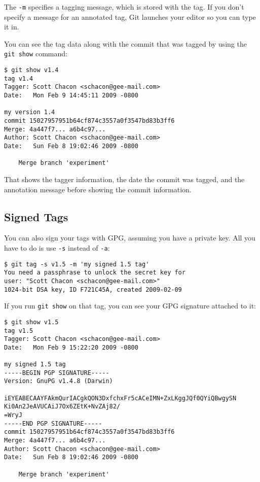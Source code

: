 \documentclass[a4paper]{book}
\begin{document}
The \texttt{-m} specifies a tagging message, which is stored with the tag. If you don't specify a message for an annotated tag, Git launches your editor so you can type it in.

You can see the tag data along with the commit that was tagged by using the \texttt{git show} command:

\begin{shaded}\begin{verbatim}
$ git show v1.4
tag v1.4
Tagger: Scott Chacon <schacon@gee-mail.com>
Date:   Mon Feb 9 14:45:11 2009 -0800

my version 1.4
commit 15027957951b64cf874c3557a0f3547bd83b3ff6
Merge: 4a447f7... a6b4c97...
Author: Scott Chacon <schacon@gee-mail.com>
Date:   Sun Feb 8 19:02:46 2009 -0800

    Merge branch 'experiment'
\end{verbatim}\end{shaded}

That shows the tagger information, the date the commit was tagged, and the annotation message before showing the commit information.

\subsection{Signed Tags}

You can also sign your tags with GPG, assuming you have a private key. All you have to do is use \texttt{-s} instead of \texttt{-a}:

\begin{shaded}\begin{verbatim}
$ git tag -s v1.5 -m 'my signed 1.5 tag'
You need a passphrase to unlock the secret key for
user: "Scott Chacon <schacon@gee-mail.com>"
1024-bit DSA key, ID F721C45A, created 2009-02-09
\end{verbatim}\end{shaded}

If you run \texttt{git show} on that tag, you can see your GPG signature attached to it:

\begin{shaded}\begin{verbatim}
$ git show v1.5
tag v1.5
Tagger: Scott Chacon <schacon@gee-mail.com>
Date:   Mon Feb 9 15:22:20 2009 -0800

my signed 1.5 tag
-----BEGIN PGP SIGNATURE-----
Version: GnuPG v1.4.8 (Darwin)

iEYEABECAAYFAkmQurIACgkQON3DxfchxFr5cACeIMN+ZxLKggJQf0QYiQBwgySN
Ki0An2JeAVUCAiJ7Ox6ZEtK+NvZAj82/
=WryJ
-----END PGP SIGNATURE-----
commit 15027957951b64cf874c3557a0f3547bd83b3ff6
Merge: 4a447f7... a6b4c97...
Author: Scott Chacon <schacon@gee-mail.com>
Date:   Sun Feb 8 19:02:46 2009 -0800

    Merge branch 'experiment'
\end{verbatim}\end{shaded}
\end{document}
